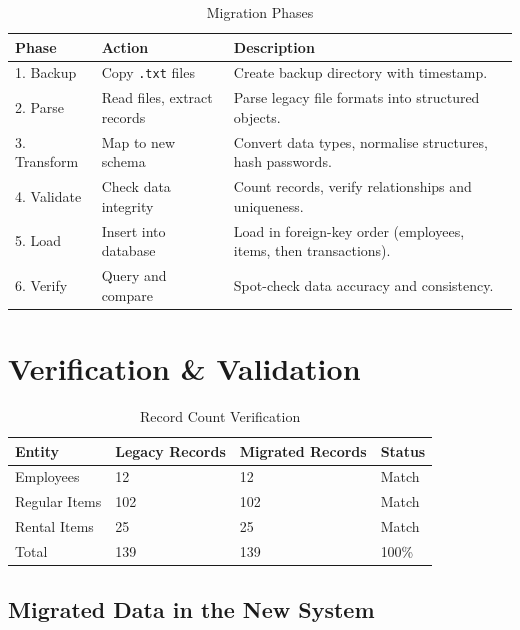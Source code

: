 \begin{table}[h]
  \centering
  \caption{Migration Phases}
  \begin{tabular}{p{2.5cm} p{3.5cm} p{6cm}}
    \toprule
    \textbf{Phase} & \textbf{Action} & \textbf{Description} \\
    \midrule
    1. Backup   & Copy \texttt{.txt} files &
      Create backup directory with timestamp. \\
    2. Parse    & Read files, extract records &
      Parse legacy file formats into structured objects. \\
    3. Transform & Map to new schema &
      Convert data types, normalise structures, hash passwords. \\
    4. Validate & Check data integrity &
      Count records, verify relationships and uniqueness. \\
    5. Load     & Insert into database &
      Load in foreign-key order (employees, items, then transactions). \\
    6. Verify   & Query and compare &
      Spot-check data accuracy and consistency. \\
    \bottomrule
  \end{tabular}
\end{table}

\section{Verification \& Validation}

\begin{table}[h]
  \centering
  \caption{Record Count Verification}
  \begin{tabular}{p{4cm} p{3cm} p{3cm} p{2cm}}
    \toprule
    \textbf{Entity} & \textbf{Legacy Records} & \textbf{Migrated Records} & \textbf{Status} \\
    \midrule
    Employees     & 12  & 12  & Match \\
    Regular Items & 102 & 102 & Match \\
    Rental Items  & 25  & 25  & Match \\
    \midrule
    Total         & 139 & 139 & 100\% \\
    \bottomrule
  \end{tabular}
\end{table}

\subsection{Migrated Data in the New System}

